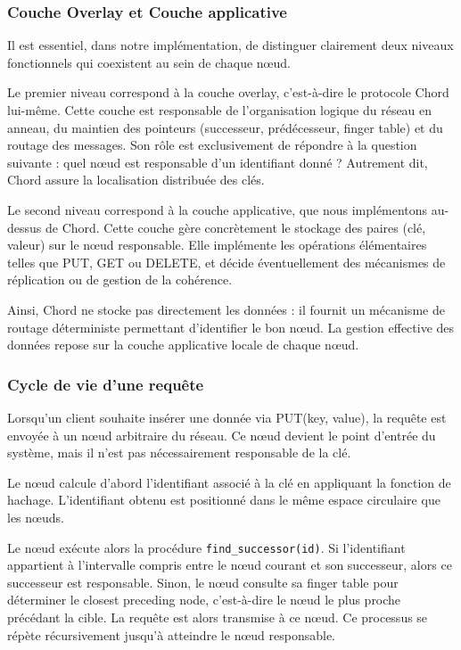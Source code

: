 \subsubsection{Couche Overlay et Couche applicative}

Il est essentiel, dans notre impl\'ementation, de distinguer clairement deux niveaux fonctionnels qui coexistent au sein de chaque n\oe ud.

Le premier niveau correspond \`a la couche overlay, c'est-\`a-dire le protocole Chord lui-m\^eme. Cette couche est responsable de l'organisation logique du r\'eseau en anneau, du maintien des pointeurs (successeur, pr\'ed\'ecesseur, finger table) et du routage des messages. Son r\^ole est exclusivement de r\'epondre \`a la question suivante : quel n\oe ud est responsable d'un identifiant donn\'e ? Autrement dit, Chord assure la localisation distribu\'ee des cl\'es.

Le second niveau correspond \`a la couche applicative, que nous impl\'ementons au-dessus de Chord. Cette couche g\`ere concr\`etement le stockage des paires (cl\'e, valeur) sur le n\oe ud responsable. Elle impl\'emente les op\'erations \'el\'ementaires telles que PUT, GET ou DELETE, et d\'ecide \'eventuellement des m\'ecanismes de r\'eplication ou de gestion de la coh\'erence.

Ainsi, Chord ne stocke pas directement les donn\'ees : il fournit un m\'ecanisme de routage d\'eterministe permettant d'identifier le bon n\oe ud. La gestion effective des donn\'ees repose sur la couche applicative locale de chaque n\oe ud.

\subsubsection{Cycle de vie d'une requ\^ete}


Lorsqu'un client souhaite ins\'erer une donn\'ee via PUT(key, value), la requ\^ete est envoy\'ee \`a un n\oe ud arbitraire du r\'eseau. Ce n\oe ud devient le point d'entr\'ee du syst\`eme, mais il n'est pas n\'ecessairement responsable de la cl\'e.

Le n\oe ud calcule d'abord l'identifiant associ\'e \`a la cl\'e en appliquant la fonction de hachage. L'identifiant obtenu est positionn\'e dans le m\^eme espace circulaire que les n\oe uds.

Le n\oe ud ex\'ecute alors la proc\'edure \texttt{find\_successor(id)}. Si l'identifiant appartient \`a l'intervalle compris entre le n\oe ud courant et son successeur, alors ce successeur est responsable. Sinon, le n\oe ud consulte sa finger table pour d\'eterminer le closest preceding node, c'est-\`a-dire le n\oe ud le plus proche pr\'ec\'edant la cible. La requ\^ete est alors transmise \`a ce n\oe ud. Ce processus se r\'ep\`ete r\'ecursivement jusqu'\`a atteindre le n\oe ud responsable.

